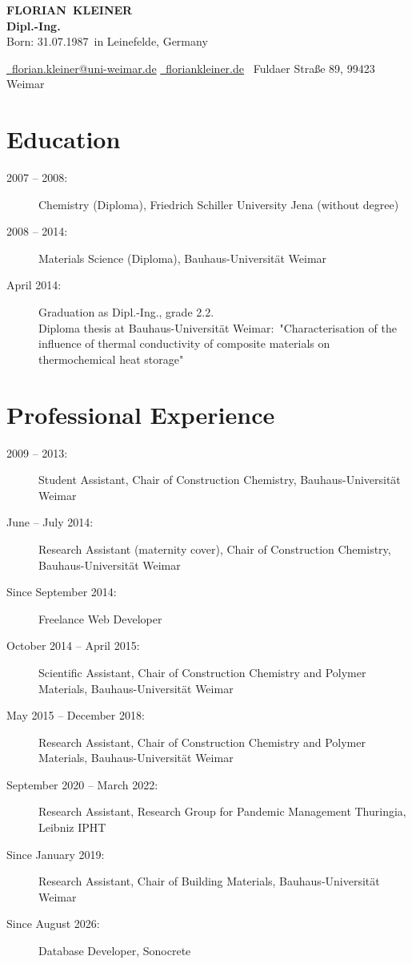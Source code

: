 \documentclass[11pt]{article}
\makeatletter
\newcommand*{\Vorname}{Florian}
\newcommand*{\Nachname}{Kleiner}
\newcommand*{\AbsenderStrasse}{Fuldaer Straße 89}
\newcommand*{\AbsenderPLZOrt}{99423 Weimar}
\newcommand*{\EMail}{florian.kleiner@uni-weimar.de}
\newcommand*{\web}{floriankleiner.de}
\newcommand*{\Geburtstag}{31.07.1987}
\newcommand*{\Geburtsort}{Leinefelde, Germany}
\newcommand*{\Ausbildungsgrad}{Dipl.-Ing.}
\newcommand*{\authorORCID}{0000-0001-6002-0829}
\makeatother
\begin{document}
\begin{center}
	{\Huge\bfseries\uppercase{\Vorname\ \Nachname}} \\ \medskip
	{\Large\textbf{\Ausbildungsgrad}} \\ \medskip
	\small Born: \Geburtstag\ in \Geburtsort \\ \medskip

	\href{mailto:\EMail}{\faEnvelope\ \EMail} \quad %
	\href{https://www.\web}{\faGlobe\ \web} \quad \faHome\ \AbsenderStrasse, \AbsenderPLZOrt \\ \medskip
	\orcidlinkf{\authorORCID}

\end{center}

\section{Education}
\begin{description}
	\item[2007 -- 2008:] Chemistry (Diploma), Friedrich Schiller University Jena (without degree)
	\item[2008 -- 2014:] Materials Science (Diploma), Bauhaus-Universität Weimar
	\item[April 2014:] Graduation as Dipl.-Ing., grade 2.2.\\
		Diploma thesis at Bauhaus-Universität Weimar:\
		"Characterisation of the influence of thermal conductivity of composite materials on thermochemical heat storage"
\end{description}


\section{Professional Experience}
\begin{description}
	\item[2009 -- 2013:] Student Assistant, Chair of Construction Chemistry, Bauhaus-Universität Weimar
	\item[June -- July 2014:] Research Assistant (maternity cover), Chair of Construction Chemistry, Bauhaus-Universität Weimar
	\item[Since September 2014:] Freelance Web Developer
	\item[October 2014 -- April 2015:] Scientific Assistant, Chair of Construction Chemistry and Polymer Materials, Bauhaus-Universität Weimar
	\item[May 2015 -- December 2018:] Research Assistant, Chair of Construction Chemistry and Polymer Materials, Bauhaus-Universität Weimar
	\item[September 2020 -- March 2022:] Research Assistant, Research Group for Pandemic Management Thuringia, Leibniz IPHT
	\item[Since January 2019:] Research Assistant, Chair of Building Materials, Bauhaus-Universität Weimar
	\item[Since August 2026:] Database Developer, Sonocrete
\end{description}
\end{document}
